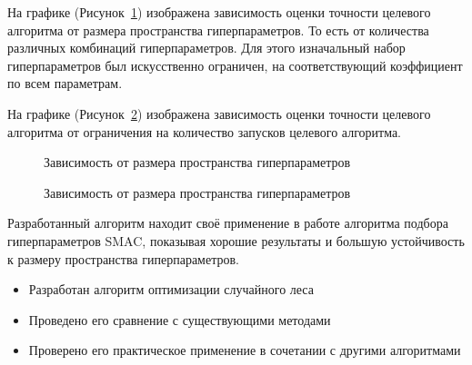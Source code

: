 \documentclass[pscyr,specification,annotation]{itmo-student-thesis}
\begin{document}
    На графике (Рисунок~\ref{smac_size}) изображена зависимость оценки точности целевого алгоритма
    от размера пространства гиперпараметров. То есть от количества различных комбинаций 
    гиперпараметров. Для этого изначальный набор гиперпараметров был искусственно ограничен, на
    соответствующий коэффициент по всем параметрам.

    На графике (Рисунок~\ref{smac_count}) изображена зависимость оценки точности целевого алгоритма
    от ограничения на количество запусков целевого алгоритма.
    \begin{center}
    \begin{figure}[h!]
    \caption{Зависимость от размера пространства гиперпараметров}\label{smac_size}
    \def \graphwidth{0.8\textwidth}
    \def \graphheight{0.4\textheight}
    
    \end{figure}
    \begin{figure}[h!]
    \caption{Зависимость от размера пространства гиперпараметров}\label{smac_count}
    \def \graphwidth{0.8\textwidth}
    \def \graphheight{0.4\textheight}
    
    \end{figure}
    \end{center}

\chapterconclusion{}
    Разработанный алгоритм находит своё применение в работе алгоритма подбора гиперпараметров SMAC,
    показывая хорошие результаты и большую устойчивость к размеру пространства гиперпараметров.


\startconclusionpage{}
    \begin{itemize}
        \item Разработан алгоритм оптимизации случайного леса
        \item Проведено его сравнение с существующими методами
        \item Проверено его практическое применение в сочетании с другими алгоритмами
    \end{itemize}

\printmainbibliography%
\end{document}

